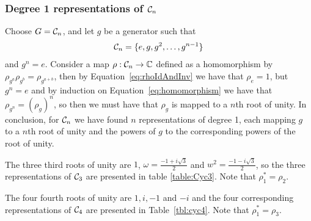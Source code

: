 \subsubsection{Degree 1 representations of $\mathcal{C}_n$}\label{sect:deg1cycn}

Choose $G = \mathcal{C}_n$, and let $g$ be a generator such that 
\begin{align*}
	\mathcal{C}_n = \{ e, g, g^2, \dots, g^{n-1}\}
\end{align*}
and $g^n = e$. Consider a map $\rho: \mathcal{C}_n \rightarrow \mathbb{C}$ defined as a homomorphism by $\rho_{g^a}\rho_{g^b} = \rho_{g^{a+b}}$, then by Equation~\ref{eq:rhoIdAndInv} we have that $\rho_e = 1$, but $g^n = e$ and by induction on Equation~\ref{eq:homomorphism} we have that $\rho_{g^n} = (\rho_g)^n$, so then we must have that $\rho_g$ is mapped to a $n$th root of unity.
In conclusion, for $\mathcal{C}_n$ we have found $n$ representations of degree 1, each mapping $g$ to a $n$th root of unity and the powers of $g$ to the corresponding powers of the root of unity.

\begin{example}[$\Cyc_3$]
	The three third roots of unity are $1$, $\omega = \frac{-1+i\sqrt{3}}{2}$ and $w^2 = \frac{-1-i\sqrt{3}}{2}$, so the three representations of $\Cyc_3$ are presented in table \ref{table:Cyc3}. Note that $\rho_1^* = \rho_2$.
	
\end{example}

\begin{example}[$\Cyc_4$]
	The four fourth roots of unity are $1,i,-1$ and $-i$ and the four corresponding representations of $\Cyc_4$ are presented in Table~\ref{tbl:cyc4}. Note that $\rho_1^* = \rho_3$.
\end{example}
	
